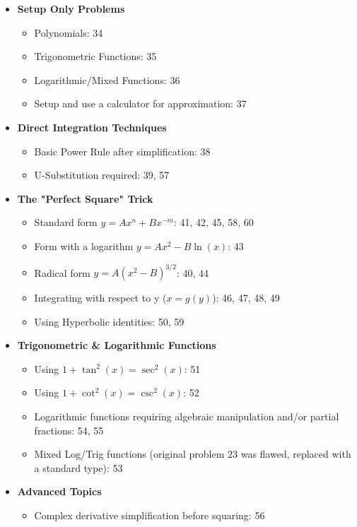 \documentclass{article}
\begin{document}
\begin{itemize}
\begin{itemize}
    \end{itemize}
    \item \textbf{Setup Only Problems}
    \begin{itemize}
        \item Polynomials: 34
        \item Trigonometric Functions: 35
        \item Logarithmic/Mixed Functions: 36
        \item Setup and use a calculator for approximation: 37
    \end{itemize}
    \item \textbf{Direct Integration Techniques}
    \begin{itemize}
        \item Basic Power Rule after simplification: 38
        \item U-Substitution required: 39, 57
    \end{itemize}
    \item \textbf{The "Perfect Square" Trick}
    \begin{itemize}
        \item Standard form $y = Ax^n + Bx^{-m}$: 41, 42, 45, 58, 60
        \item Form with a logarithm $y = Ax^2 - B\ln(x)$: 43
        \item Radical form $y = A(x^2-B)^{3/2}$: 40, 44
        \item Integrating with respect to y ($x=g(y)$): 46, 47, 48, 49
        \item Using Hyperbolic identities: 50, 59
    \end{itemize}
    \item \textbf{Trigonometric \& Logarithmic Functions}
    \begin{itemize}
        \item Using $1+\tan^2(x)=\sec^2(x)$: 51
        \item Using $1+\cot^2(x)=\csc^2(x)$: 52
        \item Logarithmic functions requiring algebraic manipulation and/or partial fractions: 54, 55
        \item Mixed Log/Trig functions (original problem 23 was flawed, replaced with a standard type): 53
    \end{itemize}
    \item \textbf{Advanced Topics}
    \begin{itemize}
        \item Complex derivative simplification before squaring: 56

\end{itemize}
\end{itemize}
\end{document}
